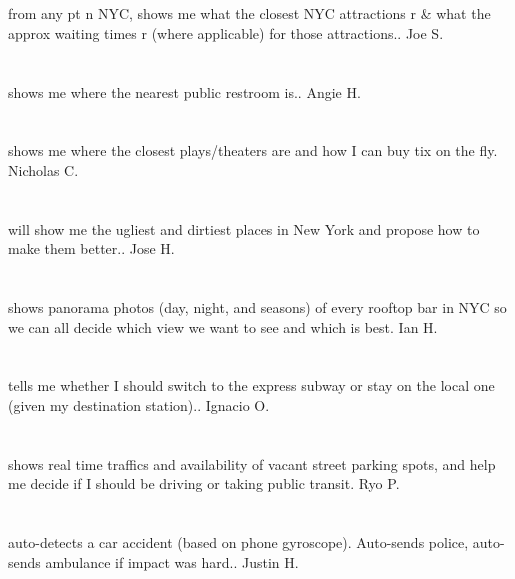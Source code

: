 \section{}from any pt n NYC,  shows me what the closest NYC attractions r \& what the approx waiting times r (where applicable) for those attractions.. Joe S.
\section{}shows me where the nearest public restroom is.. Angie H.
\section{}shows me where the closest plays/theaters are and how I can buy tix on the fly. Nicholas C.
\section{}will show me  the ugliest and dirtiest  places in New York and propose how to make them better.. Jose H.
\section{}shows panorama photos (day,  night,  and seasons) of every rooftop bar in NYC so we can all decide which view we want to see and which is best. Ian H.
\section{}tells me whether I should switch to the express subway or stay on the local one (given my destination station).. Ignacio O.
\section{}shows real time traffics and availability of vacant street parking spots,  and help me decide if I should be driving or taking public transit. Ryo P.
\section{} auto-detects a car accident (based on phone gyroscope). Auto-sends police,  auto-sends ambulance if impact was hard.. Justin H.
